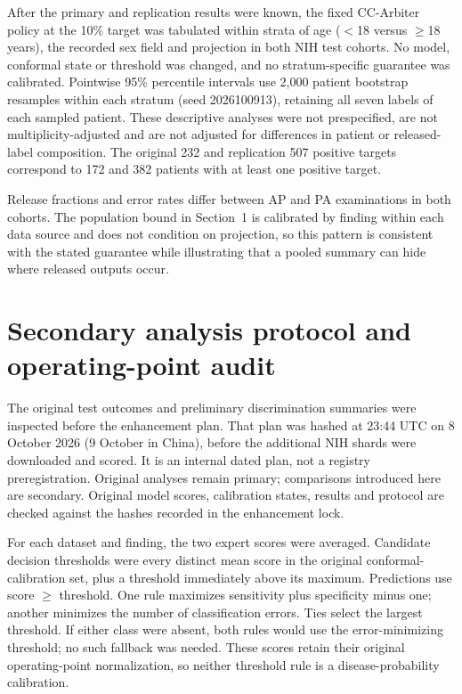 \documentclass[10pt,a4paper]{article}
\begin{document}
After the primary and replication results were known, the fixed CC-Arbiter policy at the 10\% target was tabulated within strata of age ($<$18 versus $\geq$18 years), the recorded sex field and projection in both NIH test cohorts. No model, conformal state or threshold was changed, and no stratum-specific guarantee was calibrated. Pointwise 95\% percentile intervals use 2,000 patient bootstrap resamples within each stratum (seed 2026100913), retaining all seven labels of each sampled patient. These descriptive analyses were not prespecified, are not multiplicity-adjusted and are not adjusted for differences in patient or released-label composition. The original 232 and replication 507 positive targets correspond to 172 and 382 patients with at least one positive target.

\noindent Release fractions and error rates differ between AP and PA examinations in both cohorts. The population bound in Section~1 is calibrated by finding within each data source and does not condition on projection, so this pattern is consistent with the stated guarantee while illustrating that a pooled summary can hide where released outputs occur.

\clearpage
\section{Secondary analysis protocol and operating-point audit}
The original test outcomes and preliminary discrimination summaries were inspected before the enhancement plan. That plan was hashed at 23:44 UTC on 8 October 2026 (9 October in China), before the additional NIH shards were downloaded and scored. It is an internal dated plan, not a registry preregistration. Original analyses remain primary; comparisons introduced here are secondary. Original model scores, calibration states, results and protocol are checked against the hashes recorded in the enhancement lock.

For each dataset and finding, the two expert scores were averaged. Candidate decision thresholds were every distinct mean score in the original conformal-calibration set, plus a threshold immediately above its maximum. Predictions use score $\geq$ threshold. One rule maximizes sensitivity plus specificity minus one; another minimizes the number of classification errors. Ties select the largest threshold. If either class were absent, both rules would use the error-minimizing threshold; no such fallback was needed. These scores retain their original operating-point normalization, so neither threshold rule is a disease-probability calibration.
\end{document}
